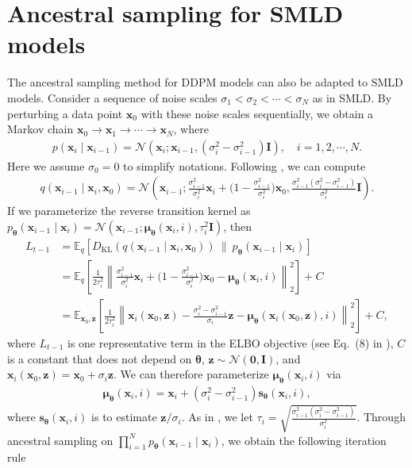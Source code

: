 \documentclass{article} \usepackage{iclr2021_conference,times}
\newcommand{\mbb}[1]{\mathbb{#1}}
\newcommand{\mcal}{\mathcal}
\newcommand{\norm}[1]{\left\lVert#1\right\rVert}
\newcommand{\bfx}{\mathbf{x}}
\newcommand{\bfz}{\mathbf{z}}
\newcommand{\bfI}{\mathbf{I}}
\newcommand{\bfzero}{\mathbf{0}}
\newcommand{\bftheta}{{\boldsymbol{\theta}}}
\newcommand{\bfs}{\mathbf{s}}
\newcommand{\bfmu}{{\boldsymbol \mu}}
\begin{document}
\section{Ancestral sampling for SMLD models}\label{app:ancestral}
The ancestral sampling method for DDPM models can also be adapted to SMLD models. Consider a sequence of noise scales $\sigma_1 < \sigma_2 < \cdots < \sigma_N$ as in SMLD. By perturbing a data point $\bfx_0$ with these noise scales sequentially, we obtain a Markov chain $\bfx_0 \to \bfx_1 \to \cdots \to \bfx_N$, where
\begin{align*}
    p(\bfx_i \mid \bfx_{i-1}) = \mcal{N}(\bfx_i; \bfx_{i-1}, (\sigma_i^2 - \sigma_{i-1}^2)\bfI), \quad i=1,2,\cdots,N.
\end{align*}
Here we assume $\sigma_0 = 0$ to simplify notations. Following \citet{ho2020denoising}, we can compute
\begin{align*}
    q(\bfx_{i-1} \mid \bfx_i, \bfx_0) = \mcal{N}\left(\bfx_{i-1}; \frac{\sigma_{i-1}^2}{\sigma_{i}^2}\bfx_i + \Big( 1 - \frac{\sigma_{i-1}^2}{\sigma_i^2} \Big)\bfx_0, \frac{\sigma_{i-1}^2 (\sigma_i^2 - \sigma_{i-1}^2)}{\sigma_i^2} \bfI  \right).
\end{align*}
If we parameterize the reverse transition kernel as $p_\bftheta(\bfx_{i-1} \mid \bfx_i) = \mcal{N}(\bfx_{i-1}; \bfmu_\bftheta(\bfx_i, i), \tau^2_i \bfI)$, then
\begin{align*}
    L_{t-1} &= \mbb{E}_q[D_{\text{KL}}(q(\bfx_{i-1} \mid \bfx_i, \bfx_0))~\|~p_\bftheta(\bfx_{i-1} \mid \bfx_i)]\\
    &= \mbb{E}_q\left[\frac{1}{2\tau^2_i} \norm{\frac{\sigma_{i-1}^2}{\sigma_{i}^2}\bfx_i + \Big( 1 - \frac{\sigma_{i-1}^2}{\sigma_i^2} \Big)\bfx_0 - \bfmu_\bftheta(\bfx_i, i)}_2^2 \right] + C\\
    &=\mbb{E}_{\bfx_0, \bfz}\left[\frac{1}{2\tau^2_i} \norm{\bfx_i(\bfx_0, \bfz) - \frac{\sigma_i^2 - \sigma_{i-1}^2}{\sigma_i} \bfz - \bfmu_\bftheta(\bfx_i(\bfx_0, \bfz), i)}_2^2 \right] + C,
\end{align*}
where $L_{t-1}$ is one representative term in the ELBO objective (see Eq.~(8) in \citet{ho2020denoising}), $C$ is a constant that does not depend on $\bftheta$, $\bfz \sim \mcal{N}(\bfzero, \bfI)$, and $\bfx_i(\bfx_0, \bfz) = \bfx_0 + \sigma_i \bfz$. We can therefore parameterize $\bfmu_\bftheta(\bfx_i, i)$ via
\begin{align*}
    \bfmu_\bftheta(\bfx_i, i) = \bfx_i + (\sigma_i^2 - \sigma_{i-1}^2) \bfs_\bftheta(\bfx_i, i),
\end{align*}
where $\bfs_\bftheta(\bfx_i, i)$ is to estimate $\bfz / \sigma_i$. As in \citet{ho2020denoising}, we let $\tau_i = \sqrt{\frac{\sigma_{i-1}^2 (\sigma_i^2 - \sigma_{i-1}^2)}{\sigma_i^2}}$. Through ancestral sampling on $\prod_{i=1}^N p_\bftheta(\bfx_{i-1} \mid \bfx_i)$, we obtain the following iteration rule
\end{document}
